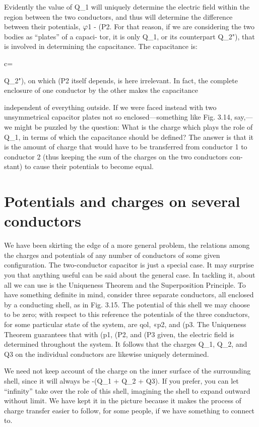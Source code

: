 Evidently the value of Q_1 will uniquely determine the electric field
within the region between the two conductors, and thus will determine
the difference between their potentials, $\varphi$1 - (P2. For that
reason, if we are considering the two bodies as ``plates'' of a capaci-
tor, it is only Q_1, or its counterpart Q_2"), that is involved in determining
the capacitance. The capacitance is:

c=%

Q_2"), on which (P2 itself depends, is here irrelevant. In fact, the complete
enclosure of one conductor by the other makes the capacitance

independent of everything outside. If we were faced instead with
two unsymmetrical capacitor plates not so enclosed---something like
Fig. 3.14, say,---we might be puzzled by the question: What is the
charge which plays the role of Q_1, in terms of which the capacitance
should be defined? The answer is that it is the amount of charge
that would have to be transferred from conductor 1 to conductor 2
(thus keeping the sum of the charges on the two conductors con-
stant) to cause their potentials to become equal.

\section{Potentials and charges on several conductors}

We have been skirting the edge of a more general problem, the
relations among the charges and potentials of any number of conductors
of some given configuration. The two-conductor capacitor
is just a special case. It may surprise you that anything useful can
be said about the general case. In tackling it, about all we can use
is the Uniqueness Theorem and the Superposition Principle. To
have something definite in mind, consider three separate conductors,
all enclosed by a conducting shell, as in Fig. 3.15. The potential of
this shell we may choose to be zero; with respect to this reference the
potentials of the three conductors, for some particular state of the
system, are qol, «p2, and (p3. The Uniqueness Theorem guarantees
that with (p1, (P2, and (P3 given, the electric field is determined throughout
the system. It follows that the charges Q_1, Q_2, and Q3 on the
individual conductors are likewise uniquely determined.

We need not keep account of the charge on the inner surface of
the surrounding shell, since it will always be -(Q_1 + Q_2 + Q3).
If you prefer, you can let ``infinity'' take over the role of this shell,
imagining the shell to expand outward without limit. We have kept
it in the picture because it makes the process of charge transfer easier
to follow, for some people, if we have something to connect to.

